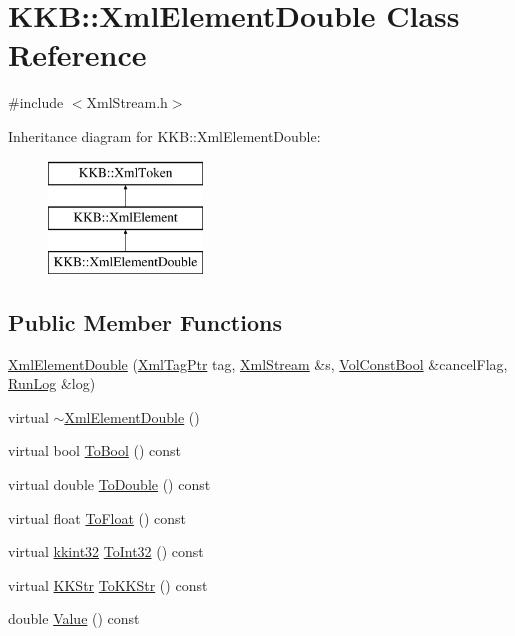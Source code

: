 \hypertarget{class_k_k_b_1_1_xml_element_double}{}\section{K\+KB\+:\+:Xml\+Element\+Double Class Reference}
\label{class_k_k_b_1_1_xml_element_double}


{\ttfamily \#include $<$Xml\+Stream.\+h$>$}

Inheritance diagram for K\+KB\+:\+:Xml\+Element\+Double\+:\begin{figure}[H]
\begin{center}
\leavevmode
\includegraphics[height=3.000000cm]{class_k_k_b_1_1_xml_element_double}
\end{center}
\end{figure}
\subsection*{Public Member Functions}
\begin{DoxyCompactItemize}
\item 
\hyperlink{class_k_k_b_1_1_xml_element_double_a421ef0e2675c5db325b9559da12e74ed}{Xml\+Element\+Double} (\hyperlink{namespace_k_k_b_a9253a3ea8a5da18ca82be4ca2b390ef0}{Xml\+Tag\+Ptr} tag, \hyperlink{class_k_k_b_1_1_xml_stream}{Xml\+Stream} \&s, \hyperlink{namespace_k_k_b_a7d390f568e2831fb76b86b56c87bf92f}{Vol\+Const\+Bool} \&cancel\+Flag, \hyperlink{class_k_k_b_1_1_run_log}{Run\+Log} \&log)
\item 
virtual \hyperlink{class_k_k_b_1_1_xml_element_double_a2fa9fd295076babf4a6918669e278475}{$\sim$\+Xml\+Element\+Double} ()
\item 
virtual bool \hyperlink{class_k_k_b_1_1_xml_element_double_a493cdcf7549a3995f35c01bebe3d0738}{To\+Bool} () const 
\item 
virtual double \hyperlink{class_k_k_b_1_1_xml_element_double_a46ff2b83d867561f3b9035e743fe52fd}{To\+Double} () const 
\item 
virtual float \hyperlink{class_k_k_b_1_1_xml_element_double_ab8cc3ee364972fa47c99430487f906cb}{To\+Float} () const 
\item 
virtual \hyperlink{namespace_k_k_b_a8fa4952cc84fda1de4bec1fbdd8d5b1b}{kkint32} \hyperlink{class_k_k_b_1_1_xml_element_double_aa3396d5635ad1542feb917e3bd667ae8}{To\+Int32} () const 
\item 
virtual \hyperlink{class_k_k_b_1_1_k_k_str}{K\+K\+Str} \hyperlink{class_k_k_b_1_1_xml_element_double_a4b178e060ff8118617e72be66bf8bd37}{To\+K\+K\+Str} () const 
\item 
double \hyperlink{class_k_k_b_1_1_xml_element_double_a8e7928b4946d9a0ee10528a102744355}{Value} () const 
\end{DoxyCompactItemize}
